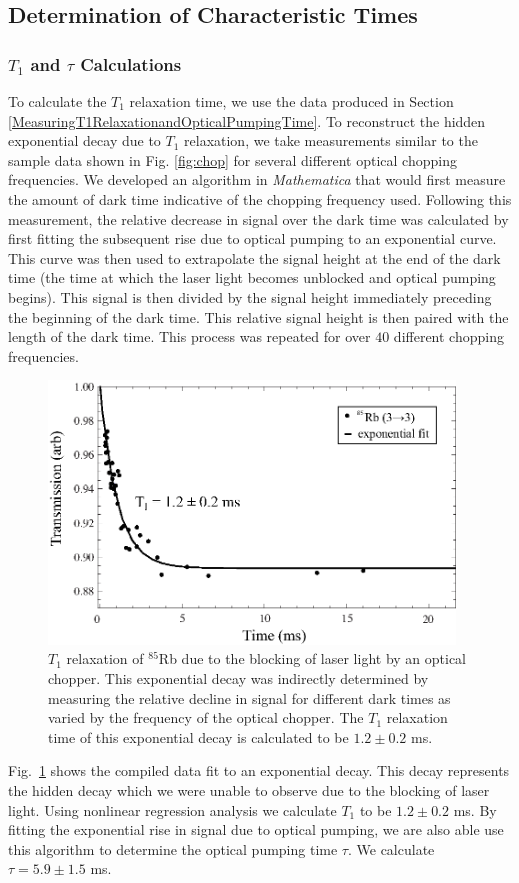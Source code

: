 \subsection{Determination of Characteristic Times}\label{DeterminationofTimes}

\subsubsection{$T_{1}$ and $\tau$ Calculations}
To calculate the $T_1$ relaxation time, we use the data produced in Section \ref{MeasuringT1RelaxationandOpticalPumpingTime}.  To reconstruct the hidden exponential decay due to $T_1$ relaxation, we take measurements similar to the sample data shown in Fig. \ref{fig:chop} for several different optical chopping frequencies.  We developed an algorithm in \emph{Mathematica} that would first measure the amount of dark time indicative of the chopping frequency used.  Following this measurement, the relative decrease in signal over the dark time was calculated by first fitting the subsequent rise due to optical pumping to an exponential curve.  This curve was then used to extrapolate the signal height at the end of the dark time (the time at which the laser light becomes unblocked and optical pumping begins).  This signal is then divided by the signal height immediately preceding the beginning of the dark time.  This relative signal height is then paired with the length of the dark time.  This process was repeated for over $40$ different chopping frequencies.  
\begin{figure}[htbp]
\begin{center}
\includegraphics[height=70mm]{./figures/T1.eps}
\caption{\small{$T_1$ relaxation of $^{85}$Rb due to the blocking of laser light by an optical chopper.  This exponential decay was indirectly determined by measuring the relative decline in signal for different dark times as varied by the frequency of the optical chopper.  The $T_1$ relaxation time of this exponential decay is calculated to be $1.2\pm 0.2$ ms.}}
\label{fig:T1}
\end{center}
\end{figure}
Fig.~\ref{fig:T1} shows the compiled data fit to an exponential decay.  This decay represents the hidden decay which we were unable to observe due to the blocking of laser light.  Using nonlinear regression analysis we calculate $T_1$ to be $1.2 \pm 0.2$ ms.  By fitting the exponential rise in signal due to optical pumping, we are also able use this algorithm to determine the optical pumping time $\tau$. We calculate $\tau=5.9 \pm 1.5$ ms.  

